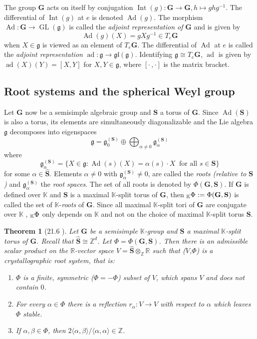 \documentclass[12pt]{amsart}
\newcommand{\R}{\mathbb{R} }
\newcommand{\Z}{\mathbb{Z} }
\newcommand{\K}{\mathbb{K}}
\newcommand{\frakg}{\mathfrak{g}}
\newcommand{\bG}{\mathbf{G}}
\newcommand{\bS}{\mathbf{S}}
\newcommand{\KPhi}{\vphantom{\Phi}_{\K}\Phi}
\numberwithin{equation}{section}
\newtheorem{theorem}{Theorem}[section]
\theoremstyle{remark} %
\begin{document}
The group $\bG$ acts on itself by conjugation $\operatorname{Int}(g) \colon \bG \to \bG, h \mapsto ghg^{-1}$. The differential of $\operatorname{Int}(g)$ at $e$ is denoted $\operatorname{Ad} (g) $. The morphism $\operatorname{Ad} \colon \bG \to \operatorname{GL}(\frakg)$ is called the \emph{adjoint representation of} $\bG$ and is given by
$$
\operatorname{Ad}(g)(X) = gXg^{-1} \in T_e\bG
$$
when $X \in \frakg$ is viewed as an element of $T_e\bG$. The differential of $\operatorname{Ad}$ at $e$ is called the \emph{adjoint representation} $\operatorname{ad} \colon \frakg \to \mathfrak{gl}(\frakg) $. Identifying $\frakg \cong T_e\bG$, $\operatorname{ad}$ is given by
$
 \operatorname{ad}(X)(Y) = \left[ X , Y \right]
$
for $X,Y \in \frakg$, where $[\cdot \,  , \cdot]$ is the matrix bracket.


\subsection{Root systems and the spherical Weyl group}\label{sec:alg_root_system}



Let $\bG$ now be a semisimple
algebraic group and $\bS$ a torus of $\bG$. Since $\operatorname{Ad} (\bS)$ is also a torus, its elements are simultaneously diagonalizable and the Lie algebra $\frakg$ decomposes into eigenspaces
$$
\frakg = \frakg_0^{(\bS)} \oplus\bigoplus_{\alpha \neq 0} \frakg_\alpha^{(\bS)}
$$
where 
$$
\frakg_\alpha^{(\bS)} = \{ X \in \frakg \colon \operatorname{Ad} (s) (X) = \alpha(s) \cdot X \ \text{ for all } s\in \bS \}
$$
for some $\alpha \in \hat{\bS}$. Elements $\alpha \neq 0$ with $\frakg_\alpha^{(\bS)} \neq 0$, are called the \emph{roots (relative to $\bS$)} and $\frakg_\alpha^{(\bS)}$ the \emph{root spaces}. The set of all roots is denoted by $\Phi(\bG,\bS)$. If $\bG$ is defined over $\K$ and $\bS$ is a maximal $\K$-split torus of $\bG$, then $\KPhi := \Phi(\bG,\bS)$ is called the set of $\K$-\emph{roots} of $\bG$. Since all maximal $\K$-split tori of $\bG$ are conjugate over $\K$ \cite[Theorem 20.9(ii)]{Bor}, $\KPhi$ only depends on $\K$ and not on the choice of maximal $\K$-split torus $\bS$.

\begin{theorem}[21.6 \cite{Bor}]\label{thm:alg_rootsystem}
	Let $\bG$ be a semisimple $\K$-group and $\bS$ a maximal $\K$-split torus of $\bG$. Recall that $\hat{\bS}\cong \Z^d$. Let $\Phi = \Phi(\bG,\bS)$. Then there is an admissible scalar product on the $\R$-vector space $V = \hat{\bS} \otimes_\Z \R$ such that ($V$,$\Phi$) is a crystallographic root system, that is:
	\begin{enumerate}
		\item $\Phi$ is a finite, symmetric ($\Phi = -\Phi$) subset of $V$, which spans $V$ and does not contain $0$.
		\item For every $\alpha \in \Phi$ there is a reflection $r_\alpha \colon V \to V$ with respect to $\alpha$ which leaves $\Phi$ stable.
		\item If $\alpha, \beta \in \Phi$, then $2\langle \alpha, \beta \rangle / \langle \alpha, \alpha \rangle \in \Z$.
	\end{enumerate} 
\end{theorem}
\end{document}
